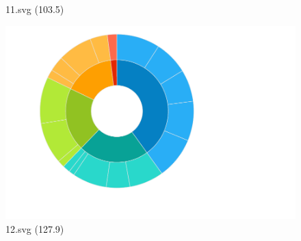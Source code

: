 \documentclass[journal]{IEEEtran}
\begin{document}
\begin{figure}[!htbp]
\begin{minipage}{0.233\columnwidth}
{11.svg (103.5)}
\end{minipage}
\hfill
\begin{minipage}{0.233\columnwidth}
\centering
\includegraphics[width=\textwidth]{Test_set/12.pdf}
{12.svg (127.9)}
\end{minipage}
\end{figure}
\end{document}
